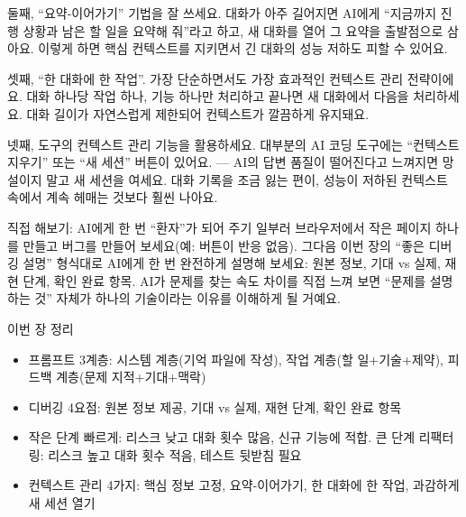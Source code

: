 둘째, “요약-이어가기” 기법을 잘 쓰세요. 대화가 아주 길어지면 AI에게 “지금까지 진행 상황과 남은 할 일을 요약해 줘”라고 하고, 새 대화를 열어 그 요약을 출발점으로 삼아요. 이렇게 하면 핵심 컨텍스트를 지키면서 긴 대화의 성능 저하도 피할 수 있어요.

셋째, “한 대화에 한 작업”. 가장 단순하면서도 가장 효과적인 컨텍스트 관리 전략이에요. 대화 하나당 작업 하나, 기능 하나만 처리하고 끝나면 새 대화에서 다음을 처리하세요. 대화 길이가 자연스럽게 제한되어 컨텍스트가 깔끔하게 유지돼요.

넷째, 도구의 컨텍스트 관리 기능을 활용하세요. 대부분의 AI 코딩 도구에는 “컨텍스트 지우기” 또는 “새 세션” 버튼이 있어요. — AI의 답변 품질이 떨어진다고 느껴지면 망설이지 말고 새 세션을 여세요. 대화 기록을 조금 잃는 편이, 성능이 저하된 컨텍스트 속에서 계속 헤매는 것보다 훨씬 나아요.

\begin{tcbpractice}{직접 해보기: AI에게 한 번 “환자”가 되어 주기}
일부러 브라우저에서 작은 페이지 하나를 만들고 버그를 만들어 보세요(예: 버튼이 반응 없음). 그다음 이번 장의 “좋은 디버깅 설명” 형식대로 AI에게 한 번 완전하게 설명해 보세요: 원본 정보, 기대 vs 실제, 재현 단계, 확인 완료 항목. AI가 문제를 찾는 속도 차이를 직접 느껴 보면 “문제를 설명하는 것” 자체가 하나의 기술이라는 이유를 이해하게 될 거예요.

\end{tcbpractice}

\begin{tcbsummary}{이번 장 정리}
\begin{itemize}
  \item 프롬프트 3계층: 시스템 계층(기억 파일에 작성), 작업 계층(할 일+기술+제약), 피드백 계층(문제 지적+기대+맥락)
  \item 디버깅 4요점: 원본 정보 제공, 기대 vs 실제, 재현 단계, 확인 완료 항목
  \item 작은 단계 빠르게: 리스크 낮고 대화 횟수 많음, 신규 기능에 적합. 큰 단계 리팩터링: 리스크 높고 대화 횟수 적음, 테스트 뒷받침 필요
  \item 컨텍스트 관리 4가지: 핵심 정보 고정, 요약-이어가기, 한 대화에 한 작업, 과감하게 새 세션 열기
\end{itemize}

\end{tcbsummary}
